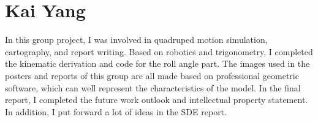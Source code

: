 \section{Kai Yang}
In this group project, I was involved in quadruped motion simulation, cartography, and report writing. Based on robotics and trigonometry, I completed the kinematic derivation and code for the roll angle part. The images used in the posters and reports of this group are all made based on professional geometric software, which can well represent the characteristics of the model. In the final report, I completed the future work outlook and intellectual property statement. In addition, I put forward a lot of ideas in the SDE report.
